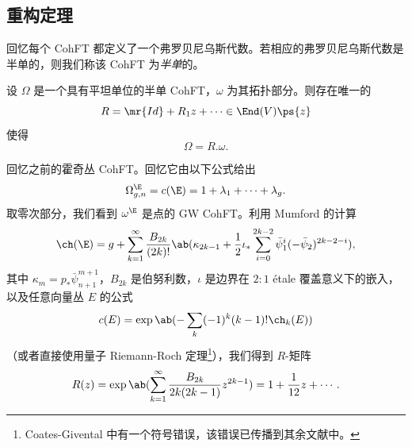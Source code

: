 \subsection{重构定理}%
\label{sub:Reconstruction theorem}

回忆每个 CohFT 都定义了一个弗罗贝尼乌斯代数。若相应的弗罗贝尼乌斯代数是半单的，则我们称该 CohFT 为\textit{半单}的。

\begin{thm}%
\label{thm:teleman}
    设 $\Omega$ 是一个具有平坦单位的半单 CohFT，$\omega$ 为其拓扑部分。则存在唯一的
    \[ R = \mr{Id} + R_1 z + \cdots \in \End(V)\ps{z} \]
    使得
    \[ \Omega = R.\omega. \]
\end{thm}

\begin{exm}
    回忆之前的霍奇丛 CohFT。回忆它由以下公式给出
    \[ \Omega^{\E}_{g,n} = c(\E) = 1 + \lambda_1 + \cdots + \lambda_g. \]
    取零次部分，我们看到 $\omega^{\E}$ 是点的 GW CohFT。利用 Mumford 的计算
    \[ \ch(\E) = g + \sum_{k=1}^{\infty} \frac{B_{2k}}{(2k)!}\ab(\kappa_{2k-1} + \frac{1}{2}\iota_*\sum_{i=0}^{2k-2} \bar{\psi}_1^{i} (-\bar{\psi}_2)^{2k-2-i}), \]
    其中 $\kappa_{m} = p_* \bar{\psi}_{n+1}^{m+1}$，$B_{2k}$ 是伯努利数，$\iota$ 是边界在 $2:1$ \'etale 覆盖意义下的嵌入，以及任意向量丛 $E$ 的公式
    \[ c(E) = \exp \ab(-\sum_k (-1)^k (k-1)!\ch_k(E)) \]
    （或者直接使用量子 Riemann-Roch 定理\footnote{Coates-Givental 中有一个符号错误，该错误已传播到其余文献中。}），我们得到 $R$-矩阵
    \[ R(z) = \exp\ab( \sum_{k=1}^{\infty} \frac{B_{2k}}{2k(2k-1)} z^{2k-1}) = 1+\frac{1}{12}z + \cdots. \]


\end{exm}
